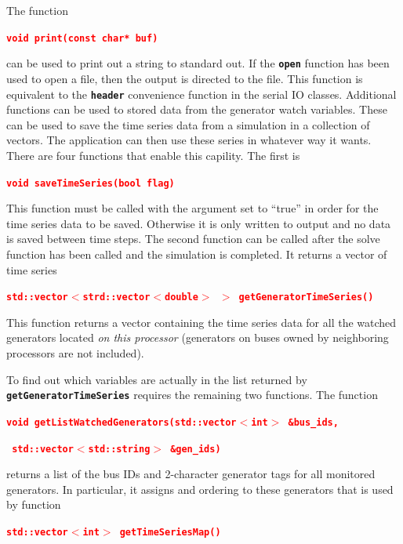 \documentclass[12pt]{report} %
\begin{document}
The function

\textcolor{red}{\texttt{\textbf{void print(const char* buf)}}}

can be used to print out a string to standard out. If the \texttt{\textbf{open}} function has been used to open a file, then the output is directed to the file. This function is equivalent to the \texttt{\textbf{header}} convenience function in the serial IO classes.
Additional functions can be used to stored data from the generator watch variables. These can be used to save the time series data from a simulation in a collection of vectors. The application can then use these series in whatever way it wants. There are four functions that enable this capility. The first is

\textcolor{red}{\texttt{\textbf{void saveTimeSeries(bool flag)}}}

This function must be called with the argument set to ``true'' in order for the time series data to be saved. Otherwise it is only written to output and no data is saved between time steps. The second function can be called after the solve function has been called and the simulation is completed. It returns a vector of time series

\textcolor{red}{\texttt{\textbf{std::vector$\boldsymbol{\mathrm{<}}$strd::vector$\boldsymbol{\mathrm{<}}$double$\boldsymbol{\mathrm{>}}$ $\boldsymbol{\mathrm{>}}$ getGeneratorTimeSeries()}}}

This function returns a vector containing the time series data for all the watched generators located \textit{on this processor} (generators on buses owned by neighboring processors are not included).

To find out which variables are actually in the list returned by \texttt{\textbf{getGeneratorTimeSeries}} requires the remaining two functions. The function

\textcolor{red}{\texttt{\textbf{void getListWatchedGenerators(std::vector$\boldsymbol{\mathrm{<}}$int$\boldsymbol{\mathrm{>}}$ \&bus\_ids,}}}

\textcolor{red}{\texttt{\textbf{    std::vector$\boldsymbol{\mathrm{<}}$std::string$\boldsymbol{\mathrm{>}}$ \&gen\_ids)}}}

returns a list of the bus IDs and 2-character generator tags for all monitored generators. In particular, it assigns and ordering to these generators that is used by function

\textcolor{red}{\texttt{\textbf{std::vector$\boldsymbol{\mathrm{<}}$int$\boldsymbol{\mathrm{>}}$ getTimeSeriesMap()}}}
\end{document}
